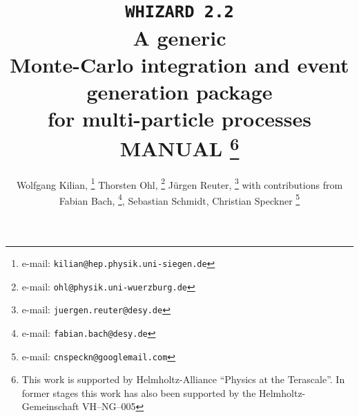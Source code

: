 \documentclass[12pt]{book}
\makeatletter
\def\preprintno#1{\def\@preprintno{#1}}
\makeatother
\begin{document}
\preprintno{}
\title{%
 \texttt{\huge WHIZARD 2.2} \\[\baselineskip]
 A generic \\ Monte-Carlo integration and event generation package \\
 for multi-particle processes\\[\baselineskip]
 MANUAL
 \footnote{%
 This work is supported by Helmholtz-Alliance ``Physics at the
 Terascale''.   
 In former stages this work has also been supported by
 the Helmholtz-Gemeinschaft VH--NG--005}
 \\[\baselineskip]
}
\def\authormail{\texttt{kilian@physik.uni-siegen.de}, 
  \texttt{ohl@physik.uni-wuerzburg.de},
  \texttt{juergen.reuter@desy.de}, \texttt{cnspeckn@googlemail.com}}
\author{%
  Wolfgang Kilian,%
    \thanks{e-mail: \texttt{kilian@hep.physik.uni-siegen.de}}
  Thorsten Ohl,%
    \thanks{e-mail: \texttt{ohl@physik.uni-wuerzburg.de}}
  J\"urgen Reuter,%
    \thanks{e-mail: \texttt{juergen.reuter@desy.de}}
  with contributions from 
  Fabian Bach, %
    \thanks{e-mail: \texttt{fabian.bach@desy.de}},
  Sebastian Schmidt, %
  Christian Speckner
    \thanks{e-mail: \texttt{cnspeckn@googlemail.com}}}
\end{document}
